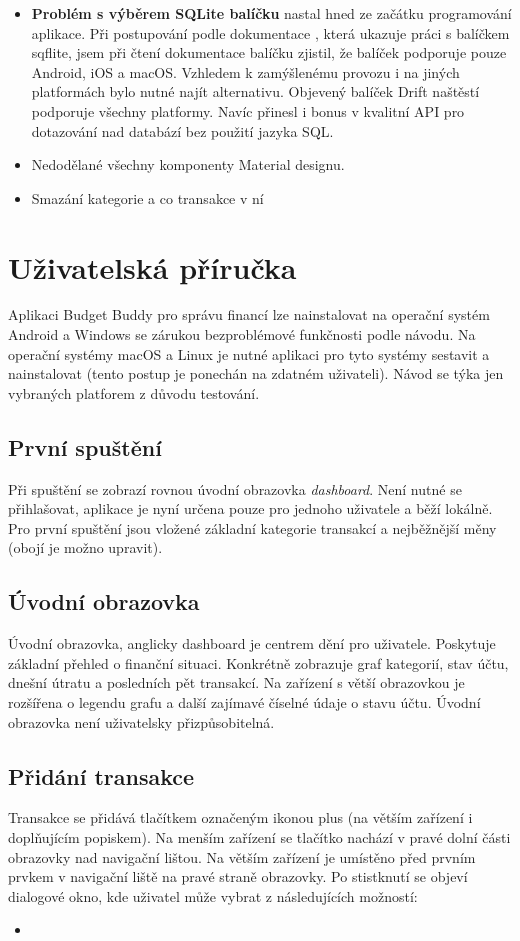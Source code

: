\documentclass[
  biblatex,
  figures=true,
  tables=false,
  glossaries,
  index
]{kidiplom}
\begin{document}
\begin{itemize}
  \item \textbf{Problém s výběrem SQLite balíčku} nastal hned ze začátku programování aplikace. Při postupování podle dokumentace \cite{flutter-docs}, která ukazuje práci s balíčkem sqflite, jsem při čtení dokumentace balíčku zjistil, že balíček podporuje pouze Android, iOS a macOS. Vzhledem k zamýšlenému provozu i na jiných platformách bylo nutné najít alternativu. Objevený balíček Drift naštěstí podporuje všechny platformy. Navíc přinesl i bonus v kvalitní API pro dotazování nad databází bez použití jazyka SQL.
  \item Nedodělané všechny komponenty Material designu.
  \item Smazání kategorie a co transakce v ní
\end{itemize}

\section{Uživatelská příručka}
Aplikaci Budget Buddy pro správu financí lze nainstalovat na operační systém Android a Windows se zárukou bezproblémové funkčnosti podle návodu. Na operační systémy macOS a Linux je nutné aplikaci pro tyto systémy sestavit a nainstalovat (tento postup je ponechán na zdatném uživateli). Návod se týka jen vybraných platforem z důvodu testování. 

\subsection{První spuštění}
Při spuštění se zobrazí rovnou úvodní obrazovka \textit{dashboard}. Není nutné se přihlašovat, aplikace je nyní určena pouze pro jednoho uživatele a běží lokálně. Pro první spuštění jsou vložené základní kategorie transakcí a nejběžnější měny (obojí je možno upravit). 

\subsection{Úvodní obrazovka}
Úvodní obrazovka, anglicky dashboard je centrem dění pro uživatele. Poskytuje základní přehled o finanční situaci. Konkrétně zobrazuje graf kategorií, stav účtu, dnešní útratu a posledních pět transakcí. Na zařízení s větší obrazovkou je rozšířena o legendu grafu a další zajímavé číselné údaje o stavu účtu. Úvodní obrazovka není uživatelsky přizpůsobitelná.

\subsection{Přidání transakce}
Transakce se přidává tlačítkem označeným ikonou plus (na větším zařízení i doplňujícím popiskem). Na menším zařízení se tlačítko nachází v pravé dolní části obrazovky nad navigační lištou. Na větším zařízení je umístěno před prvním prvkem v navigační liště na pravé straně obrazovky. Po stistknutí se objeví dialogové okno, kde uživatel může vybrat z následujících možností:
\begin{itemize}
  \item 
\end{itemize}
\end{document}
